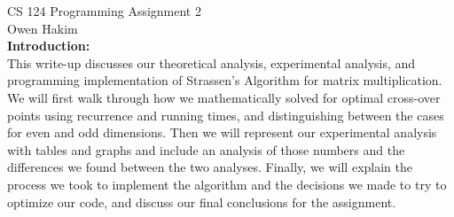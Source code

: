\documentclass[11pt]{article}
\begin{document}
CS 124 Programming Assignment 2 \\
\indent Owen Hakim
\\

\textbf{Introduction:}\\
This write-up discusses our theoretical analysis, experimental analysis, and programming implementation of Strassen's Algorithm for matrix multiplication. We will first walk through how we mathematically solved for optimal cross-over points using recurrence and running times, and distinguishing between the cases for even and odd dimensions. Then we will represent our experimental analysis with tables and graphs and include an analysis of those numbers and the differences we found between the two analyses. Finally, we will explain the process we took to implement the algorithm and the decisions we made to try to optimize our code, and discuss our final conclusions for the assignment. \\\\
\end{document}
